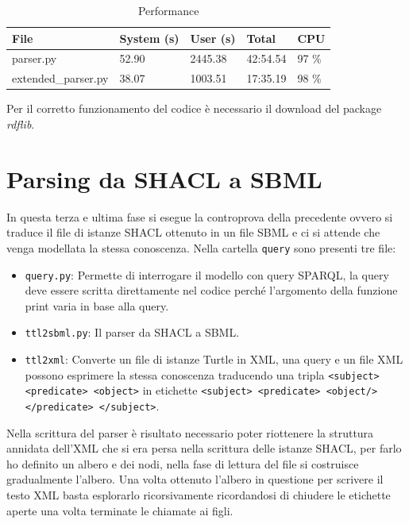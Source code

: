 \documentclass{article}
\begin{document}
\begin{table}[h!t] 
    \centering
    \begin{longtable}{p{3.3cm}p{2cm}p{1.5cm}p{1.5cm}p{1.5cm}}
        \textbf{File} & \textbf{System (s)} & \textbf{User (s)} & \textbf{Total} & \textbf{CPU} \\
        \hline
        parser.py & 52.90 & 2445.38 & 42:54.54 & 97 \% \\
        extended\_parser.py & 38.07 & 1003.51 & 17:35.19 & 98 \% \\
        \hline
    \end{longtable}
    \caption{Performance}
    \label{tab:performance}
\end{table}

Per il corretto funzionamento del codice è necessario il download del package \textit{rdflib}.

\section{Parsing da SHACL a SBML}
In questa terza e ultima fase si esegue la controprova della precedente ovvero si traduce il file di istanze SHACL ottenuto in un file SBML e ci si attende che venga modellata la stessa conoscenza. Nella cartella \texttt{query} sono presenti tre file:

\begin{itemize}
    \item \texttt{query.py}: Permette di interrogare il modello con query SPARQL, la query deve essere scritta direttamente nel codice perché l'argomento della funzione print varia in base alla query.
    \item \texttt{ttl2sbml.py}: Il parser da SHACL a SBML.
    \item \texttt{ttl2xml}: Converte un file di istanze Turtle in XML, una query e un file XML possono esprimere la stessa conoscenza traducendo una tripla \texttt{<subject> <predicate> <object>} in etichette \texttt{<subject> <predicate> <object/> </predicate> </subject>}.
\end{itemize}

Nella scrittura del parser è risultato necessario poter riottenere la struttura annidata dell'XML che si era persa nella scrittura delle istanze SHACL, per farlo ho definito un albero e dei nodi, nella fase di lettura del file si costruisce gradualmente l'albero. Una volta ottenuto l'albero in questione per scrivere il testo XML basta esplorarlo ricorsivamente ricordandosi di chiudere le etichette aperte una volta terminate le chiamate ai figli. 
\end{document}
